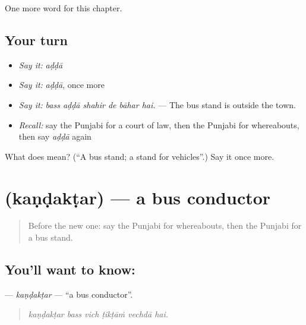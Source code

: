 \begin{grammarlens}[title={What you've built}]
One more word for this chapter.
\end{grammarlens}

\subsection*{Your turn}
\begin{itemize}
\raggedright
  \item \emph{Say it:} \emph{aḍḍā}
  \item \emph{Say it:} \emph{aḍḍā}, once more
  \item \emph{Say it:} \emph{bass aḍḍā shahir de bāhar hai.} — The bus stand is outside the town.
  \item \emph{Recall:} say the Punjabi for a court of law, then the Punjabi for whereabouts, then say \emph{aḍḍā} again
\end{itemize}

\begin{tcolorbox}[breakable,colback=teal!4,colframe=teal!35!black,title={Before you move on}]
What does  mean? (\textquotedblleft{}A bus stand; a stand for vehicles\textquotedblright{}.) Say it once more.
\end{tcolorbox}
\section[\texorpdfstring{\pa{ਕੰਡਕਟਰ} (kaṇḍakṭar)}{ਕੰਡਕਟਰ (kaṇḍakṭar)}]{ (kaṇḍakṭar) — a bus conductor}

\label{lesson:PA-C268-kandaktar}



\begin{quote}
Before the new one: say the Punjabi for whereabouts, then the Punjabi for a bus stand.
\end{quote}

\subsection*{You'll want to know: }
\textbf{} — \emph{kaṇḍakṭar} — \textquotedblleft{}a bus conductor\textquotedblright{}.

\begin{quote}
     
\end{quote}

\begin{quote}
\emph{kaṇḍakṭar bass vich ṭikṭāṁ vechdā hai.}
\end{quote}

